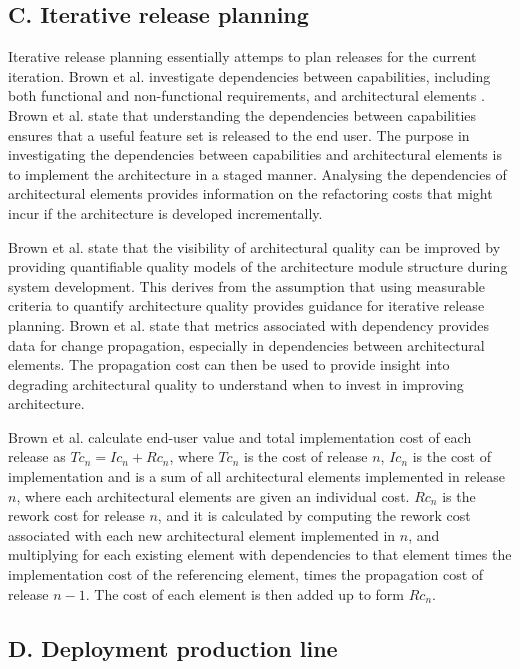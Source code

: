 \documentclass[conference]{IEEEtran}
\begin{document}
\subsection{C. Iterative release planning}

Iterative release planning essentially attemps to plan releases for the current iteration. Brown et al. investigate dependencies between capabilities, including both functional and non-functional requirements, and architectural elements \cite{brown2011analysis}. Brown et al. state that understanding the dependencies between capabilities ensures that a useful feature set is released to the end user. The purpose in investigating the dependencies between capabilities and architectural elements is to implement the architecture in a staged manner. Analysing the dependencies of architectural elements provides information on the refactoring costs that might incur if the architecture is developed incrementally.

Brown et al. state that the visibility of architectural quality can be improved by providing quantifiable quality models of the architecture module structure during system development. This derives from the assumption that using measurable criteria to quantify architecture quality provides guidance for iterative release planning. Brown et al. state that metrics associated with dependency provides data for change propagation, especially in dependencies between architectural elements. The propagation cost can then be used to provide insight into degrading architectural quality to understand when to invest in improving architecture.

Brown et al. calculate end-user value and total implementation cost of each release as $Tc_n = Ic_n + Rc_n$, where $Tc_n$ is the cost of release $n$, $Ic_n$ is the cost of implementation and is a sum of all architectural elements implemented in release $n$, where each architectural elements are given an individual cost. $Rc_n$ is the rework cost for release $n$, and it is calculated by computing the rework cost associated with each new architectural element implemented in $n$, and multiplying for each existing element with dependencies to that element times the implementation cost of the referencing element, times the propagation cost of release $n-1$. The cost of each element is then added up to form $Rc_n$.

\subsection{D. Deployment production line}
\end{document}
